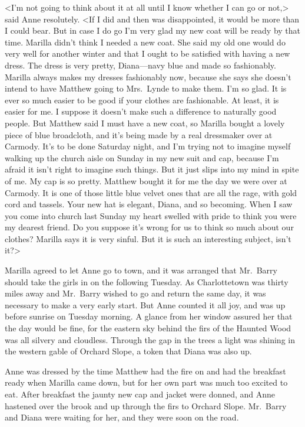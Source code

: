 <I'm not going to think about it at all until I know whether I can go or not,> said Anne resolutely. <If I did and then was disappointed, it would be more than I could bear. But in case I do go I'm very glad my new coat will be ready by that time. Marilla didn't think I needed a new coat. She said my old one would do very well for another winter and that I ought to be satisfied with having a new dress. The dress is very pretty, Diana—navy blue and made so fashionably. Marilla always makes my dresses fashionably now, because she says she doesn't intend to have Matthew going to Mrs.~Lynde to make them. I'm so glad. It is ever so much easier to be good if your clothes are fashionable. At least, it is easier for me. I suppose it doesn't make such a difference to naturally good people. But Matthew said I must have a new coat, so Marilla bought a lovely piece of blue broadcloth, and it's being made by a real dressmaker over at Carmody. It's to be done Saturday night, and I'm trying not to imagine myself walking up the church aisle on Sunday in my new suit and cap, because I'm afraid it isn't right to imagine such things. But it just slips into my mind in spite of me. My cap is so pretty. Matthew bought it for me the day we were over at Carmody. It is one of those little blue velvet ones that are all the rage, with gold cord and tassels. Your new hat is elegant, Diana, and so becoming. When I saw you come into church last Sunday my heart swelled with pride to think you were my dearest friend. Do you suppose it's wrong for us to think so much about our clothes? Marilla says it is very sinful. But it is such an interesting subject, isn't it?>

Marilla agreed to let Anne go to town, and it was arranged that Mr.~Barry should take the girls in on the following Tuesday. As Charlottetown was thirty miles away and Mr.~Barry wished to go and return the same day, it was necessary to make a very early start. But Anne counted it all joy, and was up before sunrise on Tuesday morning. A glance from her window assured her that the day would be fine, for the eastern sky behind the firs of the Haunted Wood was all silvery and cloudless. Through the gap in the trees a light was shining in the western gable of Orchard Slope, a token that Diana was also up.

Anne was dressed by the time Matthew had the fire on and had the breakfast ready when Marilla came down, but for her own part was much too excited to eat. After breakfast the jaunty new cap and jacket were donned, and Anne hastened over the brook and up through the firs to Orchard Slope. Mr.~Barry and Diana were waiting for her, and they were soon on the road.

